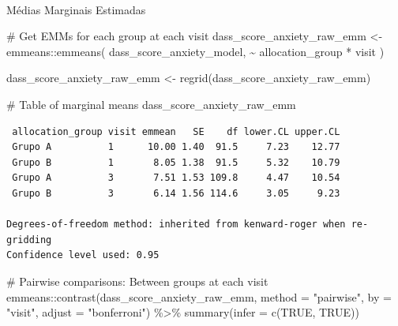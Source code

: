 \documentclass[
  letterpaper,
  DIV=11,
  numbers=noendperiod]{scrartcl}
\makeatletter
\let\oldparagraph\paragraph
\renewcommand{\paragraph}{
    \@ifstar
      \xxxParagraphStar
      \xxxParagraphNoStar
  }
\newcommand{\xxxParagraphStar}[1]{\oldparagraph*{#1}\mbox{}}
\newcommand{\xxxParagraphNoStar}[1]{\oldparagraph{#1}\mbox{}}
\newenvironment{Shaded}{\begin{snugshade}}{\end{snugshade}}
\newcommand{\AttributeTok}[1]{\textcolor[rgb]{0.40,0.45,0.13}{#1}}
\newcommand{\CommentTok}[1]{\textcolor[rgb]{0.37,0.37,0.37}{#1}}
\newcommand{\ConstantTok}[1]{\textcolor[rgb]{0.56,0.35,0.01}{#1}}
\newcommand{\FunctionTok}[1]{\textcolor[rgb]{0.28,0.35,0.67}{#1}}
\newcommand{\NormalTok}[1]{\textcolor[rgb]{0.00,0.23,0.31}{#1}}
\newcommand{\OtherTok}[1]{\textcolor[rgb]{0.00,0.23,0.31}{#1}}
\newcommand{\SpecialCharTok}[1]{\textcolor[rgb]{0.37,0.37,0.37}{#1}}
\newcommand{\StringTok}[1]{\textcolor[rgb]{0.13,0.47,0.30}{#1}}
\makeatother
\begin{document}
\paragraph{Médias Marginais
Estimadas}\label{muxe9dias-marginais-estimadas-23}

\begin{Shaded}
\begin{Highlighting}[]
\CommentTok{\# Get EMMs for each group at each visit}
\NormalTok{dass\_score\_anxiety\_raw\_emm }\OtherTok{\textless{}{-}}\NormalTok{ emmeans}\SpecialCharTok{::}\FunctionTok{emmeans}\NormalTok{(}
\NormalTok{    dass\_score\_anxiety\_model, }
    \SpecialCharTok{\textasciitilde{}}\NormalTok{ allocation\_group }\SpecialCharTok{*}\NormalTok{ visit}
\NormalTok{)}

\NormalTok{dass\_score\_anxiety\_raw\_emm }\OtherTok{\textless{}{-}} \FunctionTok{regrid}\NormalTok{(dass\_score\_anxiety\_raw\_emm)}

\CommentTok{\# Table of marginal means}
\NormalTok{dass\_score\_anxiety\_raw\_emm}
\end{Highlighting}
\end{Shaded}

\begin{verbatim}
 allocation_group visit emmean   SE    df lower.CL upper.CL
 Grupo A          1      10.00 1.40  91.5     7.23    12.77
 Grupo B          1       8.05 1.38  91.5     5.32    10.79
 Grupo A          3       7.51 1.53 109.8     4.47    10.54
 Grupo B          3       6.14 1.56 114.6     3.05     9.23

Degrees-of-freedom method: inherited from kenward-roger when re-gridding 
Confidence level used: 0.95 
\end{verbatim}

\begin{Shaded}
\begin{Highlighting}[]
\CommentTok{\# Pairwise comparisons: Between groups at each visit}
\NormalTok{emmeans}\SpecialCharTok{::}\FunctionTok{contrast}\NormalTok{(dass\_score\_anxiety\_raw\_emm, }\AttributeTok{method =} \StringTok{"pairwise"}\NormalTok{, }\AttributeTok{by =} \StringTok{"visit"}\NormalTok{, }\AttributeTok{adjust =} \StringTok{"bonferroni"}\NormalTok{) }\SpecialCharTok{\%\textgreater{}\%} \FunctionTok{summary}\NormalTok{(}\AttributeTok{infer =} \FunctionTok{c}\NormalTok{(}\ConstantTok{TRUE}\NormalTok{, }\ConstantTok{TRUE}\NormalTok{))}
\end{Highlighting}
\end{Shaded}
\end{document}
